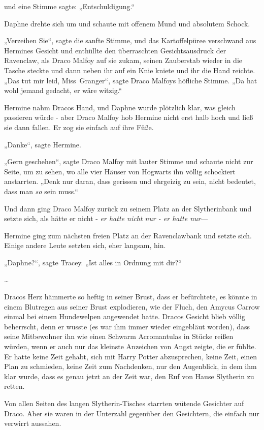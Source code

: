 {und eine Stimme sagte: „Entschuldigung.“

Daphne drehte sich um und schaute mit offenem Mund und absolutem Schock.

„Verzeihen Sie“, sagte die sanfte Stimme, und das Kartoffelpüree verschwand aus Hermines Gesicht und enthüllte den überraschten Gesichtsausdruck der Ravenclaw, als Draco Malfoy auf sie zukam, seinen Zauberstab wieder in die Tasche steckte und dann neben ihr auf ein Knie kniete und ihr die Hand reichte. „Das tut mir leid, Miss~Granger“, sagte Draco Malfoys höfliche Stimme. „Da hat wohl jemand gedacht, er wäre witzig.“

Hermine nahm Dracos Hand, und Daphne wurde plötzlich klar, was gleich passieren würde - aber Draco Malfoy hob Hermine nicht erst halb hoch und ließ sie dann fallen. Er zog sie einfach auf ihre Füße.

„Danke“, sagte Hermine.

„Gern geschehen“, sagte Draco Malfoy mit lauter Stimme und schaute nicht zur Seite, um zu sehen, wo alle vier Häuser von Hogwarts ihn völlig schockiert anstarrten. „Denk nur daran, dass gerissen und ehrgeizig zu sein, nicht bedeutet, dass man \emph{so} sein muss.“

Und dann ging Draco Malfoy zurück zu seinem Platz an der Slytherinbank und setzte sich, als hätte er nicht - \emph{er hatte nicht nur - er hatte nur}—

Hermine ging zum nächsten freien Platz an der Ravenclawbank und setzte sich. Einige andere Leute setzten sich, eher langsam, hin.

„Daphne?“, sagte Tracey. „Ist alles in Ordnung mit dir?“

…

Dracos Herz hämmerte so heftig in seiner Brust, dass er befürchtete, es könnte in einem Blutregen aus seiner Brust explodieren, wie der Fluch, den Amycus Carrow einmal bei einem Hundewelpen angewendet hatte. Dracos Gesicht blieb völlig beherrscht, denn er wusste (es war ihm immer wieder eingebläut worden), dass seine Mitbewohner ihn wie einen Schwarm Acromantulas in Stücke reißen würden, wenn er auch nur das kleinste Anzeichen von Angst zeigte, die er fühlte. Er hatte keine Zeit gehabt, sich mit Harry Potter abzusprechen, keine Zeit, einen Plan zu schmieden, keine Zeit zum Nachdenken, nur den Augenblick, in dem ihm klar wurde, dass es genau jetzt an der Zeit war, den Ruf von Hause Slytherin zu retten.

Von allen Seiten des langen Slytherin-Tisches starrten wütende Gesichter auf Draco. Aber sie waren in der Unterzahl gegenüber den Gesichtern, die einfach nur verwirrt aussahen.

}
